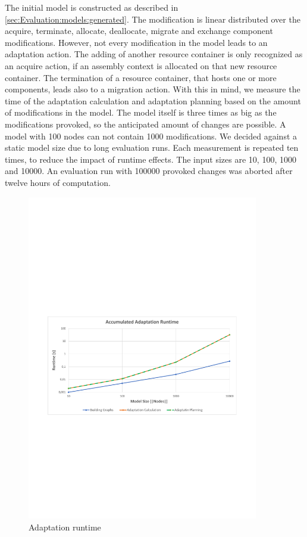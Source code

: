The initial model is constructed as described in \autoref{sec:Evaluation:models:generated}. The modification is linear distributed over the acquire, terminate, allocate, deallocate, migrate and exchange component modifications. However, not every modification in the model leads to an adaptation action. The adding of another resource container is only recognized as an acquire action, if an assembly context is allocated on that new resource container. The termination of a resource container, that hosts one or more components, leads also to a migration action. With this in mind, we measure the time of the adaptation calculation and adaptation planning based on the amount of modifications in the model. The model itself is three times as big as the modifications provoked, so the anticipated amount of changes are possible. A model with 100 nodes can not contain 1000 modifications. We decided against a static model size due to long evaluation runs. Each measurement is repeated ten times, to reduce the impact of runtime effects. The input sizes are 10, 100, 1000 and 10000. An evaluation run with 100000 provoked changes was aborted after twelve hours of computation.

\begin{figure}[h]
	\centering
	\includegraphics[trim = 15mm 95mm 15mm 105mm, clip, width=0.90\textwidth]{graphs/Runtime_adapt}
	\caption{Adaptation runtime}
	\label{fig:eval:adap:runtime}
\end{figure}

